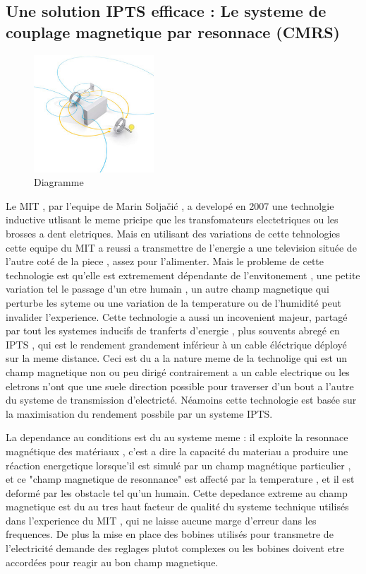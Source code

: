 \documentclass[12pt]{report}
\begin{document}
\subsection{Une solution IPTS efficace : Le systeme de couplage magnetique par resonnace (CMRS) \cite{mSojal}}
\begin{figure}
  \begin{center}
  \includegraphics[width=0.4\textwidth]{WTdiagram}
  \end{center}
\caption{Diagramme}
\end{figure}Le MIT , par l'equipe de Marin Soljačić , a developé en 2007 une technolgie inductive utlisant le meme pricipe que les transfomateurs electetriques ou les brosses a dent eletriques. Mais en utilisant des variations de cette tehnologies cette equipe du MIT a reussi a transmettre de l'energie a une television située de l'autre coté de la piece , assez pour l'alimenter. Mais le probleme de cette technologie est qu'elle est extremement dépendante de l'envitonement , une petite variation tel le passage d'un etre humain , un autre champ magnetique qui perturbe les syteme ou une variation de la temperature ou de l'humidité peut invalider l'experience. Cette technologie a aussi un incovenient majeur, partagé par tout les systemes inducifs de tranferts d'energie , plus souvents abregé en IPTS , qui est le rendement grandement inférieur à un cable éléctrique déployé sur la meme distance. Ceci est du a la nature meme de la technolige qui est un champ magnetique non ou peu dirigé contrairement a un cable electrique ou les eletrons n'ont que une suele direction possible pour traverser d'un bout a l'autre du systeme de transmission d'electricté. Néamoins cette technologie est basée sur la maximisation du rendement possbile par un systeme IPTS.

	La dependance au conditions est du au systeme meme : il exploite la resonnace magnétique des matériaux , c'est a dire la capacité du materiau a produire une réaction energetique lorsque'il est simulé par un champ magnétique particulier , et ce "champ magnetique de resonnance" est affecté par la temperature , et il est deformé par les obstacle tel qu'un humain. Cette depedance extreme au champ magnetique est du au tres haut facteur de qualité du systeme technique utilisés dans l'experience du MIT , qui ne laisse aucune marge d'erreur dans les frequences. De plus la mise en place des bobines utilisés pour transmetre de l'electricité demande des reglages plutot complexes ou les bobines doivent etre accordées pour reagir au bon champ magnetique.
	
\end{document}
